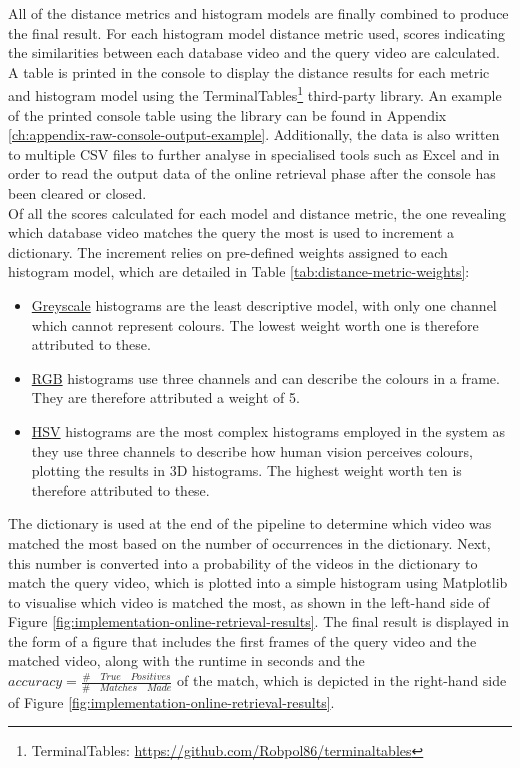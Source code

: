 All of the distance metrics and histogram models are finally combined to produce the final result. For each histogram model distance metric used, scores indicating the similarities between each database video and the query video are calculated. A table is printed in the console to display the distance results for each metric and histogram model using the TerminalTables\footnote{TerminalTables: \url{https://github.com/Robpol86/terminaltables}} third-party library. An example of the printed console table using the library can be found in Appendix \ref{ch:appendix-raw-console-output-example}. Additionally, the data is also written to multiple CSV files to further analyse in specialised tools such as Excel and in order to read the output data of the online retrieval phase after the console has been cleared or closed.\\

Of all the scores calculated for each model and distance metric, the one revealing which database video matches the query the most is used to increment a dictionary. The increment relies on pre-defined weights assigned to each histogram model, which are detailed in Table \ref{tab:distance-metric-weights}:

\begin{itemize}
    \item \underline{Greyscale} histograms are the least descriptive model, with only one channel which cannot represent colours. The lowest weight worth one is therefore attributed to these.
    \item \underline{RGB} histograms use three channels and can describe the colours in a frame. They are therefore attributed a weight of 5.
    \item \underline{HSV} histograms are the most complex histograms employed in the system as they use three channels to describe how human vision perceives colours, plotting the results in 3D histograms. The highest weight worth ten is therefore attributed to these.
\end{itemize}



The dictionary is used at the end of the pipeline to determine which video was matched the most based on the number of occurrences in the dictionary. Next, this number is converted into a probability of the videos in the dictionary to match the query video, which is plotted into a simple histogram using Matplotlib to visualise which video is matched the most, as shown in the left-hand side of Figure \ref{fig:implementation-online-retrieval-results}. The final result is displayed in the form of a figure that includes the first frames of the query video and the matched video, along with the runtime in seconds and the $accuracy = \frac{\# \quad True \quad Positives}{\# \quad Matches \quad Made}$ of the match, which is depicted in the right-hand side of Figure \ref{fig:implementation-online-retrieval-results}.\\

